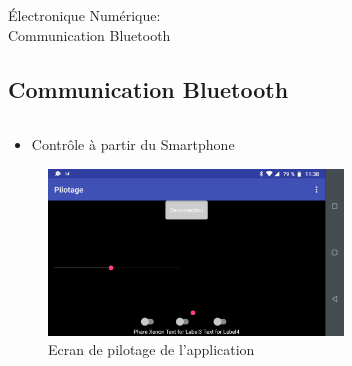 \documentclass{beamer}
\begin{document}
	\begin{frame}{Électronique Numérique:\\Communication Bluetooth}
		\subsection[Bluetooth]{Communication Bluetooth}
		\begin{columns}[T]
	  		\begin{column}{0.5\textwidth}
		    	\begin{itemize}
		    		\item Contrôle à partir du Smartphone
		    	\end{itemize}
		    	\begin{figure}
		    		\includegraphics[width=0.8\textwidth]{../Illus/AppPilotage.png}
	    			\caption{Ecran de pilotage de l'application}
	    		 \end{figure}
	  		\end{column}
	  		\begin{column}{0.5\textwidth}
	  			\begin{figure}

\end{figure}
\end{column}
\end{columns}
\end{frame}
\end{document}
